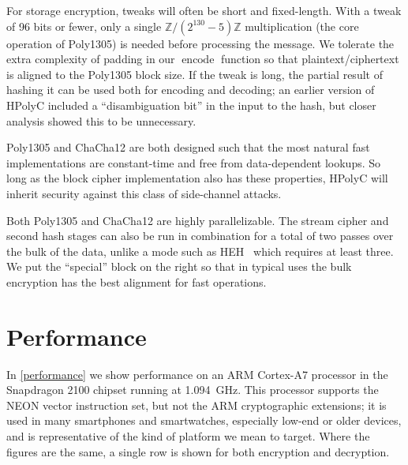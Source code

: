 \documentclass[letterpaper,luatex,11pt]{article}
\DeclareMathOperator{\encode}{encode}
\begin{document}
For storage encryption, tweaks will often be short and fixed-length. With a tweak
of 96 bits or fewer, only a single
$\mathbb{Z}/(2^{130}-5)\mathbb{Z}$ multiplication (the core operation of Poly1305)
is needed before processing the message. We tolerate
the extra complexity of padding in our $\encode$ function so that plaintext/ciphertext
is aligned to the Poly1305 block size. If the
tweak is long, the partial result of hashing it can be used both for encoding and decoding; an
earlier version of HPolyC included a ``disambiguation bit'' in the input to the hash, but
closer analysis showed this to be unnecessary.

Poly1305 and ChaCha12 are both designed such that the most natural fast implementations are
constant-time and free from data-dependent lookups. So long as the block cipher implementation
also has these properties, HPolyC will inherit security against
this class of side-channel attacks.

Both Poly1305 and ChaCha12 are highly parallelizable.
The stream cipher and second hash stages can also be run in combination for a total
of two passes over the bulk of the data, unlike a mode such as HEH~\cite{heh}
which requires at least three.
We put the ``special'' block on the right so that in typical uses the bulk encryption has
the best alignment for fast operations.

\section{Performance}

In \autoref{performance} we
show performance on an ARM \mbox{Cortex-A7}
processor in the Snapdragon 2100 chipset running at \mbox{1.094 GHz}.  This
processor supports the NEON vector instruction set, but not the ARM cryptographic
extensions; it is used in many smartphones and smartwatches, especially low-end
or older devices, and is representative of the kind of platform we mean to target.
Where the figures are the same, a single row is shown for both encryption and decryption.
\end{document}
